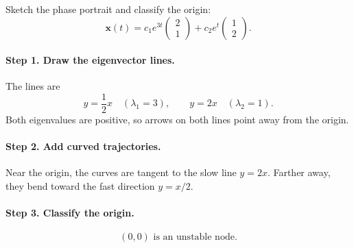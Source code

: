 \documentclass[10pt,letterpaper]{article}
\begin{document}
\begin{example}[3]{
Sketch the phase portrait and classify the origin:
\[
\mathbf{x}(t)
=c_1e^{3t}\begin{pmatrix}2\\1\end{pmatrix}
+c_2e^t\begin{pmatrix}1\\2\end{pmatrix}.
\]
}

\paragraph{Step 1. Draw the eigenvector lines.}
The lines are
\[
y=\frac12x\quad(\lambda_1=3),
\qquad
y=2x\quad(\lambda_2=1).
\]
Both eigenvalues are positive, so arrows on both
lines point away from the origin.

\paragraph{Step 2. Add curved trajectories.}
Near the origin, the curves are tangent to the
slow line $y=2x$. Farther away, they bend toward
the fast direction $y=x/2$.

\paragraph{Step 3. Classify the origin.}
\[
\boxed{(0,0)\text{ is an unstable node.}}
\]

\begin{center}
\end{center}
\end{example}
\end{document}
